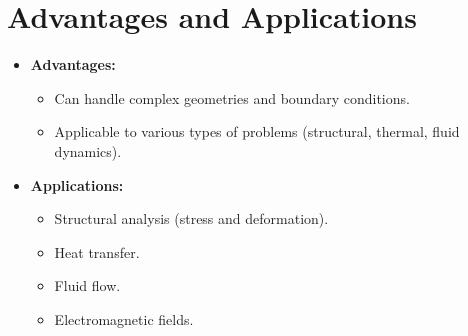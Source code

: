 \section{Advantages and Applications}
\begin{itemize}
    \item \textbf{Advantages:}
    \begin{itemize}
        \item Can handle complex geometries and boundary conditions.
        \item Applicable to various types of problems (structural, thermal, fluid dynamics).
    \end{itemize}
    \item \textbf{Applications:}
    \begin{itemize}
        \item Structural analysis (stress and deformation).
        \item Heat transfer.
        \item Fluid flow.
        \item Electromagnetic fields.
    \end{itemize}
\end{itemize}
